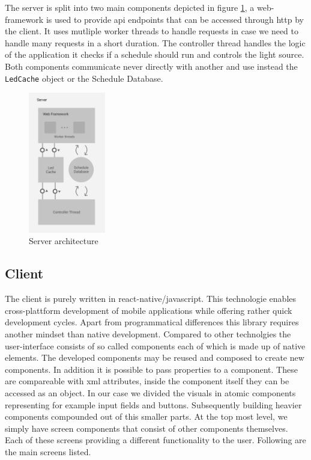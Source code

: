 \documentclass[conference]{IEEEtran}
\begin{document}
The server is split into two main components depicted in figure \ref{serverArch}, a web-framework is used to provide api endpoints that can be accessed through http by 
the client. It uses mutliple worker threads to handle requests in case we need to handle many requests in a short duration.
The controller thread handles the logic of the application it checks if a schedule should run and controls the light source.
Both components communicate never directly with another and use instead the \texttt{LedCache} object or the Schedule Database.

\begin{figure}[H]
    \centering
    \includegraphics[width=0.3\textwidth]{server_architecture}
    \caption{Server architecture}
    \label{serverArch}
\end{figure}

\subsection{Client}
The client is purely written in react-native/javascript. This technologie enables cross-plattform development of mobile applications 
while offering rather quick development cycles. Apart from programmatical differences this library requires another mindset than 
native development. Compared to other technolgies the user-interface consists of so called components each of which is made up of
native elements. The developed components may be reused and composed to create new components. In addition it is possible to pass
properties to a component. These are compareable with xml attributes, inside the component itself they can be accessed as an object. 
In our case we divided the visuals in atomic components representing for example input fields and buttons. Subsequently building
heavier components compounded out of this smaller parts. At the top most level, we simply have screen components that consist of 
other components themselves. Each of these screens providing a different functionality to the user. Following are the main screens
listed.
\end{document}
